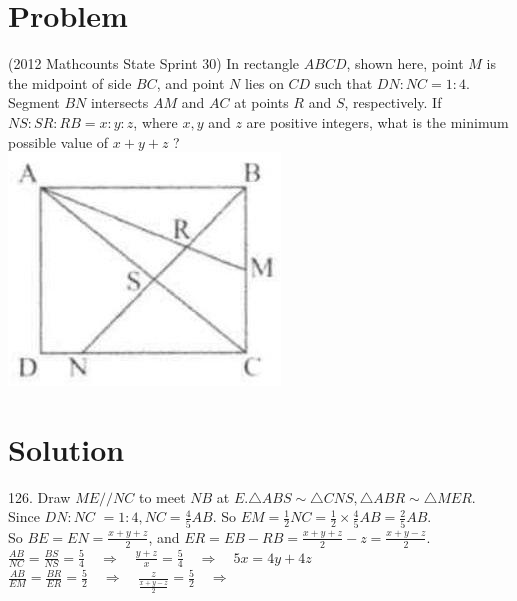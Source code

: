 \documentclass{article}
\begin{document}
\section*{Problem}
(2012 Mathcounts State Sprint 30) In rectangle \(A B C D\), shown here, point \(M\) is the midpoint of side \(B C\), and point \(N\) lies on \(C D\) such that \(D N: N C=1: 4\). Segment \(B N\) intersects \(A M\) and \(A C\) at points \(R\) and \(S\), respectively. If \(N S: S R: R B=x: y: z\), where \(x, y\) and \(z\) are positive integers, what is the minimum possible value of \(x+y+z\) ?\\
\centering
\includegraphics[width=\textwidth]{images/127(2).jpg}

\section*{Solution}
126.
Draw \(M E / / N C\) to meet \(N B\) at \(E . \triangle A B S \sim \triangle C N S, \triangle A B R \sim \triangle M E R\). Since \(D N: N C\) \(=1: 4, N C=\frac{4}{5} A B\). So \(E M=\frac{1}{2} N C=\frac{1}{2} \times \frac{4}{5} A B=\frac{2}{5} A B\).\\
So \(B E=E N=\frac{x+y+z}{2}\), and \(E R=E B-R B=\frac{x+y+z}{2}-z=\frac{x+y-z}{2}\).\\
\(\frac{A B}{N C}=\frac{B S}{N S}=\frac{5}{4} \quad \Rightarrow \quad \frac{y+z}{x}=\frac{5}{4} \quad \Rightarrow \quad 5 x=4 y+4 z\)\\
\(\frac{A B}{E M}=\frac{B R}{E R}=\frac{5}{2} \quad \Rightarrow \quad \frac{z}{\frac{x+y-z}{2}}=\frac{5}{2} \quad \Rightarrow\)
\end{document}
